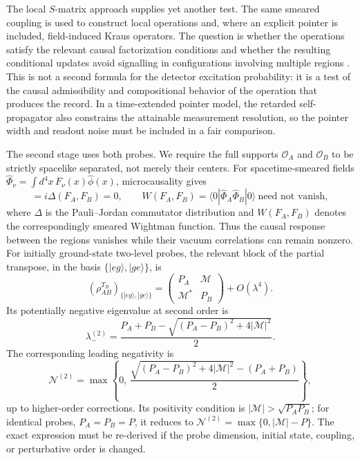 \documentclass[pdflatex,sn-mathphys-num]{sn-jnl}
\begin{document}
The local $S$-matrix approach supplies yet another test. The same smeared coupling is used to construct local operations and, where an explicit pointer is included, field-induced Kraus operators. The question is whether the operations satisfy the relevant causal factorization conditions and whether the resulting conditional updates avoid signalling in configurations involving multiple regions \cite{Simmons2026}. This is not a second formula for the detector excitation probability: it is a test of the causal admissibility and compositional behavior of the operation that produces the record. In a time-extended pointer model, the retarded self-propagator also constrains the attainable measurement resolution, so the pointer width and readout noise must be included in a fair comparison.

The second stage uses both probes. We require the full supports $\mathcal O_A$ and $\mathcal O_B$ to be strictly spacelike separated, not merely their centers. For spacetime-smeared fields $\hat\Phi_\nu=\int d^4x\,F_\nu(x)\hat\phi(x)$, microcausality gives
\begin{equation}
[\hat\Phi_A,\hat\Phi_B]
=i\Delta(F_A,F_B)=0,
\qquad
W(F_A,F_B)=\langle0|\hat\Phi_A\hat\Phi_B|0\rangle
\ \text{need not vanish},
\label{eq:benchmark-spacelike}
\end{equation}
where $\Delta$ is the Pauli--Jordan commutator distribution and
$W(F_A,F_B)$ denotes the correspondingly smeared Wightman function. Thus the causal response between the regions vanishes while their vacuum correlations can remain nonzero. For initially ground-state two-level probes, the relevant block of the partial transpose, in the basis $\{|eg\rangle,|ge\rangle\}$, is
\begin{equation}
(\rho_{AB}^{T_B})_{\{|eg\rangle,|ge\rangle\}}
=\begin{pmatrix}P_A&\mathcal M\\\mathcal M^*&P_B\end{pmatrix}+O(\lambda^4).
\end{equation}
Its potentially negative eigenvalue at second order is
\begin{equation}
\lambda_-^{(2)}
=\frac{P_A+P_B-\sqrt{(P_A-P_B)^2+4|\mathcal M|^2}}{2}.
\end{equation}
The corresponding leading negativity is
\begin{equation}
\mathcal N^{(2)}
=\max\!\left\{0,\,
\frac{\sqrt{(P_A-P_B)^2+4|\mathcal M|^2}-(P_A+P_B)}{2}
\right\},
\label{eq:benchmark-negativity}
\end{equation}
up to higher-order corrections. Its positivity condition is $|\mathcal M|>\sqrt{P_AP_B}$; for identical probes, $P_A=P_B=P$, it reduces to $\mathcal N^{(2)}=\max\{0,|\mathcal M|-P\}$. The exact expression must be re-derived if the probe dimension, initial state, coupling, or perturbative order is changed.
\end{document}
